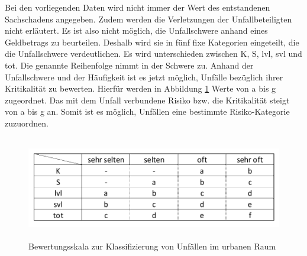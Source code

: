 Bei den vorliegenden Daten wird nicht immer der Wert des entstandenen Sachschadens angegeben. Zudem werden die Verletzungen der Unfallbeteiligten nicht erläutert. Es ist also nicht möglich, die Unfallschwere anhand eines Geldbetrags zu beurteilen. Deshalb wird sie in fünf fixe Kategorien eingeteilt, die die Unfallschwere verdeutlichen. Es wird unterschieden zwischen \ac{K}, \ac{S}, \ac{lvl}, \ac{svl} und \ac{tot}. Die genannte Reihenfolge nimmt in der Schwere zu. Anhand der Unfallschwere und der Häufigkeit ist es jetzt möglich, Unfälle bezüglich ihrer Kritikalität zu bewerten. Hierfür werden in Abbildung \ref{fig:Bewertungsskala} Werte von a bis g zugeordnet. Das mit dem Unfall verbundene Risiko bzw. die Kritikalität steigt von a bis g an. Somit ist es möglich, Unfällen eine bestimmte Risiko-Kategorie zuzuordnen.

\begin{savenotes}
	\begin{figure}[H]
		\centering
		\includegraphics[width=16cm,height=4.5cm]{figures/Bewertungsskala}
		\caption[Bewertungsskala zur Klassifizierung von Unfällen im urbanen Raum]{Bewertungsskala zur Klassifizierung von Unfällen im urbanen Raum}\label{fig:Bewertungsskala}
	\end{figure}
\end{savenotes}

